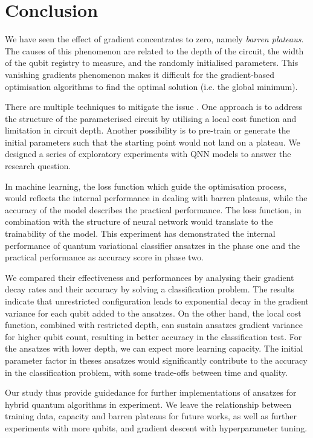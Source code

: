\section{Conclusion}
We have seen the effect of gradient concentrates to zero, namely \emph{barren plateaus}.
The causes of this phenomenon are related to the depth of the circuit, the width of the qubit registry to measure, and the randomly initialised parameters.
This vanishing gradients phenomenon makes it difficult for the gradient-based optimisation algorithms to find the optimal solution (i.e. the global minimum).

There are multiple techniques to mitigate the issue \cite{cerezoCostFunctionDependent2021, skolikLayerwiseLearningQuantum2021, grantInitializationStrategyAddressing2019}.
One approach is to address the structure of the parameterised circuit by utilising a local cost function and limitation in circuit depth.
Another possibility is to pre-train or generate the initial parameters such that the starting point would not land on a plateau.
We designed a series of exploratory experiments with QNN models to answer the research question.

In machine learning, the loss function which guide the optimisation process, would reflects the internal performance in dealing with barren plateaus, while the accuracy of the model describes the practical performance.
The loss function, in combination with the structure of neural network would translate to the trainability of the model.
This experiment has demonstrated the internal performance of quantum variational classifier ansatzes in the phase one and the practical performance as accuracy score in phase two.

We compared their effectiveness and performances by analysing their gradient decay rates and their accuracy by solving a classification problem.
The results indicate that unrestricted configuration leads to exponential decay in the gradient variance for each qubit added to the ansatzes.
On the other hand, the local cost function, combined with restricted depth, can sustain ansatzes gradient variance for higher qubit count, resulting in better accuracy in the classification test.
For the ansatzes with lower depth, we can expect more learning capacity.
The initial parameter factor in theses ansatzes would significantly contribute to the accuracy in the classification problem, with some trade-offs between time and quality.

Our study thus provide guidedance for further implementations of ansatzes for hybrid quantum algorithms in experiment.
We leave the relationship between training data, capacity and barren plateaus for future works, as well as further experiments with more qubits, and gradient descent with hyperparameter tuning.